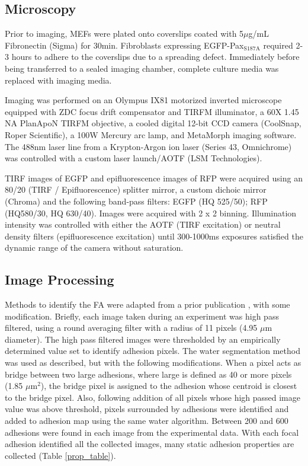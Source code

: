 \documentclass[10pt]{article}
\begin{document}
\subsection*{Microscopy}

Prior to imaging, MEFs were plated onto coverslips coated with 5$\mu$g/mL
Fibronectin (Sigma) for 30min. Fibroblasts expressing EGFP-Pax$_{\textrm{S187A}}$
required 2-3 hours to adhere to the coverslips due to a spreading defect.
Immediately before being transferred to a sealed imaging chamber, complete
culture media was replaced with imaging media. 

Imaging was performed on an Olympus IX81 motorized inverted microscope equipped
with ZDC focus drift compensator and TIRFM illuminator, a 60X 1.45 NA PlanApoN
TIRFM objective, a cooled digital 12-bit CCD camera (CoolSnap, Roper
Scientific), a 100W Mercury arc lamp, and MetaMorph imaging software. The 488nm
laser line from a Krypton-Argon ion laser (Series 43, Omnichrome) was controlled
with a custom laser launch/AOTF (LSM Technologies).  

TIRF images of EGFP and epifluorescence images of RFP were acquired using an
80/20 (TIRF / Epifluorescence) splitter mirror, a custom dichoic mirror (Chroma)
and the following band-pass filters: EGFP (HQ 525/50); RFP (HQ580/30, HQ
630/40). Images were acquired with 2 x 2 binning. Illumination intensity was
controlled with either the AOTF (TIRF excitation) or neutral density filters
(epifluorescence excitation) until 300-1000ms exposures satisfied the dynamic
range of the camera without saturation. 

\subsection*{Image Processing}

Methods to identify the FA were adapted from a prior publication
\cite{Zamir1999}, with some modification. Briefly, each image taken during an
experiment was high pass filtered, using a round averaging filter with a radius
of 11 pixels (4.95 $\mu$m diameter). The high pass filtered images were
thresholded by an empirically determined value set to identify adhesion pixels.
The water segmentation method was used as described, but with the following
modifications. When a pixel acts as bridge between two large adhesions, where
large is defined as 40 or more pixels (1.85 $\mu$m$^2$), the bridge pixel is
assigned to the adhesion whose centroid is closest to the bridge pixel. Also,
following addition of all pixels whose high passed image value was above
threshold, pixels surrounded by adhesions were identified and added to adhesion
map using the same water algorithm. Between 200 and 600 adhesions were found in
each image from the experimental data. With each focal adhesion identified all
the collected images, many static adhesion properties are collected (Table
\ref{prop_table}).
\end{document}
